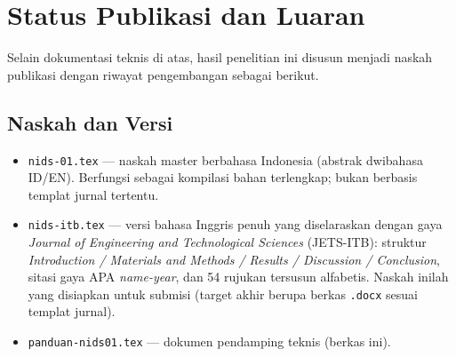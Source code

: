 \documentclass[11pt, a4paper]{article}
\begin{document}
\section{Status Publikasi dan Luaran}
Selain dokumentasi teknis di atas, hasil penelitian ini disusun menjadi naskah publikasi dengan riwayat pengembangan sebagai berikut.

\subsection{Naskah dan Versi}
\begin{itemize}[leftmargin=1.4cm]
    \item \texttt{nids-01.tex} --- naskah master berbahasa Indonesia (abstrak dwibahasa ID/EN). Berfungsi sebagai kompilasi bahan terlengkap; bukan berbasis templat jurnal tertentu.
    \item \texttt{nids-itb.tex} --- versi bahasa Inggris penuh yang diselaraskan dengan gaya \textit{Journal of Engineering and Technological Sciences} (JETS-ITB): struktur \textit{Introduction / Materials and Methods / Results / Discussion / Conclusion}, sitasi gaya APA \textit{name-year}, dan 54 rujukan tersusun alfabetis. Naskah inilah yang disiapkan untuk submisi (target akhir berupa berkas \texttt{.docx} sesuai templat jurnal).
    \item \texttt{panduan-nids01.tex} --- dokumen pendamping teknis (berkas ini).
\end{itemize}
\end{document}
